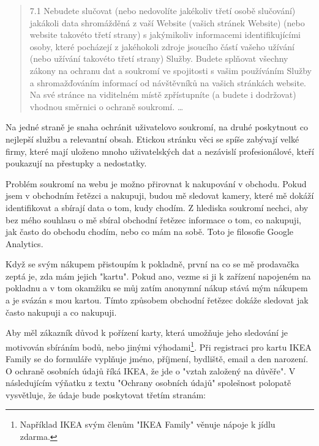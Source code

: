 \documentclass[bc,female,java,dept456]{diploma}						%
\begin{document}
\begin{quote}
7.1 Nebudete slučovat (nebo nedovolíte jakékoliv třetí osobě slučování) jakákoli data shromážděná z vaší Website (vašich stránek Website) (nebo website takovéto třetí strany) s jakýmikoliv informacemi identifikujícími osoby, které pocházejí z jakéhokoli zdroje jsoucího částí vašeho užívání (nebo užívání takovéto třetí strany) Služby. Budete splňovat všechny zákony na ochranu dat a soukromí ve spojitosti s vašim používáním Služby a shromažďováním informací od návštěvníků na vašich stránkách website. Na své stránce na viditelném místě zpřístupníte (a budete i dodržovat) vhodnou směrnici o ochraně soukromí.
\ldots
\end{quote}

Na jedné straně je snaha ochránit uživatelovo soukromí, na druhé poskytnout co nejlepší službu a relevantní obsah. Etickou stránku věci se spíše zabývají velké firmy, které mají uloženo mnoho uživatelských dat a nezávislí profesionálové, kteří poukazují na přestupky a nedostatky.

Problém soukromí na webu je možno přirovnat k nakupování v obchodu. Pokud jsem v obchodním řetězci a nakupuji, budou mě sledovat kamery, které mě dokáží identifikovat a sbírají data o tom, kudy chodím. Z hlediska soukromí nechci, aby bez mého souhlasu o mě sbíral obchodní řetězec informace o tom, co nakupuji, jak často do obchodu chodím, nebo co mám na sobě. Toto je filosofie Google Analytics.

Když se svým nákupem přistoupím k pokladně, první na co se mě prodavačka zeptá je, zda mám jejich "kartu". Pokud ano, vezme si ji k zařízení napojeném na pokladnu a v tom okamžiku se můj zatím anonymní nákup stává mým nákupem a je svázán s mou kartou. Tímto způsobem obchodní řetězec dokáže sledovat jak často nakupuji a co nakupuji.

Aby měl zákazník důvod k pořízení karty, která umožňuje jeho sledování je motivován sbíráním bodů, nebo jinými výhodami\footnote{Například IKEA svým členům "IKEA Family" věnuje nápoje k jídlu zdarma.}. Při registraci pro kartu IKEA Family se do formuláře vyplňuje jméno, příjmení, bydliště, email a den narození. O ochraně osobních údajů říká IKEA, že jde o "vztah založený na důvěře". V následujícím výňatku z textu "Ochrany osobních údajů" spolešnost polopatě vysvětluje, že údaje bude poskytovat třetím stranám:
\end{document}
